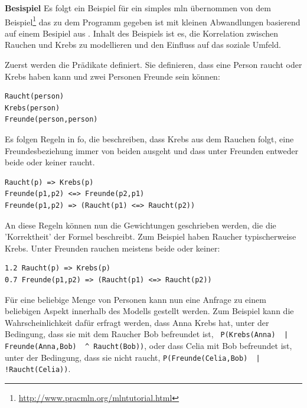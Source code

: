 \textbf{Besispiel}\label{mlnexample} Es folgt ein Beispiel für ein simples \gls{mln} übernommen von dem Beispiel\footnote{\url{http://www.pracmln.org/mlntutorial.html}} das zu dem Programm \pracmln gegeben ist mit kleinen Abwandlungen basierend auf einem Besipiel aus \cite{nyga17}. Inhalt des Beispiels ist es, die Korrelation zwischen Rauchen und Krebs zu modellieren und den Einfluss auf das soziale Umfeld. \par
Zuerst werden die Prädikate definiert. Sie definieren, dass eine Person raucht oder Krebs haben kann und zwei Personen Freunde sein können:
\begin{lstlisting}[backgroundcolor=\color{backcolour}]
Raucht(person)
Krebs(person)
Freunde(person,person)
\end{lstlisting}
Es folgen Regeln in \gls{fo}, die beschreiben, dass Krebs aus dem Rauchen folgt, eine Freundesbeziehung immer von beiden ausgeht und dass unter Freunden entweder beide oder keiner raucht. 
\begin{lstlisting}[backgroundcolor=\color{backcolour}]
Raucht(p) => Krebs(p)
Freunde(p1,p2) <=> Freunde(p2,p1)
Freunde(p1,p2) => (Raucht(p1) <=> Raucht(p2))
\end{lstlisting}
An diese Regeln können nun die Gewichtungen geschrieben werden, die die 'Korrektheit' der Formel beschreibt. Zum Beispiel haben Raucher typischerweise Krebs. Unter Freunden rauchen meistens beide oder keiner:
\begin{lstlisting}[backgroundcolor=\color{backcolour}]
1.2 Raucht(p) => Krebs(p)
0.7 Freunde(p1,p2) => (Raucht(p1) <=> Raucht(p2))
\end{lstlisting}  
Für eine beliebige Menge von Personen kann nun eine Anfrage zu einem beliebigen Aspekt innerhalb des Modells  gestellt werden. Zum Beispiel kann die Wahrscheinlichkeit dafür erfragt werden, dass Anna Krebs hat, unter der Bedingung, dass sie mit dem Raucher Bob befreundet ist, \lstinline[breaklines=true]{ P(Krebs(Anna)  | Freunde(Anna,Bob)  ^ Raucht(Bob))}, oder dass Celia mit Bob befreundet ist, unter der Bedingung, dass sie nicht raucht, \lstinline[breaklines=true]{P(Freunde(Celia,Bob)  | !Raucht(Celia))}.


